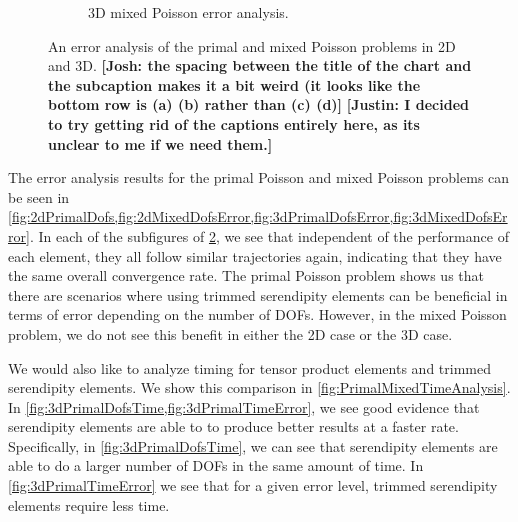 \documentclass[format=acmsmall,screen,timestamp=false,a4paper]{acmart}
\newcommand\josh[1]{\textbf{\textcolor[rgb]{0,.5,1}{[Josh: #1]}}}
\newcommand\justin[1]{\textbf{\textcolor[rgb]{0,1,0.5}{[Justin: #1]}}}
\begin{document}
\begin{figure}[h!]
\begin{subfigure}[h]{0.5\textwidth}
      \caption{3D mixed Poisson error analysis.}
    \label{fig:3dMixedDofsError}
  \end{subfigure}
  \caption{An error analysis of the primal and mixed Poisson problems in 2D and 3D.  \josh{the spacing between the title of the chart and the subcaption makes it a bit weird (it looks like the bottom row is (a) (b) rather than (c) (d)} \justin{I decided to try getting rid of the captions entirely here, as its unclear to me if we need them.}}
\label{fig:PrimalMixedErrorAnalysis}
\end{figure}


The error analysis results for the primal Poisson and mixed Poisson problems can be seen in \cref{fig:2dPrimalDofs,fig:2dMixedDofsError,fig:3dPrimalDofsError,fig:3dMixedDofsError}.  In each of the subfigures of \cref{fig:PrimalMixedErrorAnalysis}, we see that independent of the performance of each element, they all follow similar trajectories again, indicating that they have the same overall convergence rate.  The primal Poisson problem shows us that there are scenarios where using trimmed serendipity elements can be beneficial in terms of error depending on the number of DOFs.  However, in the mixed Poisson problem, we do not see this benefit in either the 2D case or the 3D case.  

We would also like to analyze timing for tensor product elements and trimmed serendipity elements.  We show this comparison in \cref{fig:PrimalMixedTimeAnalysis}.  In \cref{fig:3dPrimalDofsTime,fig:3dPrimalTimeError}, we see good evidence that serendipity elements are able to to produce better results at a faster rate.  Specifically, in \cref{fig:3dPrimalDofsTime}, we can see that serendipity elements are able to do a larger number of DOFs in the same amount of time.  In \cref{fig:3dPrimalTimeError} we see that for a given error level, trimmed serendipity elements require less time.
\end{document}
